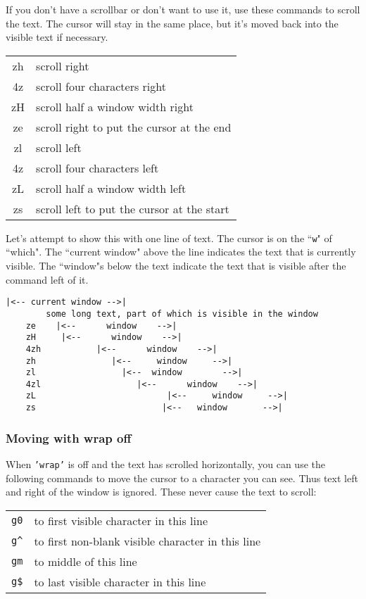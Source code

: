If you don't have a scrollbar or don't want to use it, use these commands to scroll the text.
The cursor will stay in the same place, but it's moved back into the visible text if necessary.

\begin{center} \begin{tabular}{c l}
				zh & scroll right \\
				4z & scroll four characters right \\
				zH & scroll half a window width right \\
				ze & scroll right to put the cursor at the end \\
				zl & scroll left \\
				4z & scroll four characters left \\
				zL & scroll half a window width left \\
				zs & scroll left to put the cursor at the start \\
\end{tabular} \end{center}

Let's attempt to show this with one line of text.
The cursor is on the ``\texttt{w}" of ``which".
The ``current window" above the line indicates the text that is currently visible.
The ``window"s below the text indicate the text that is visible after the command left of it.

\begin{Verbatim}[samepage=true]
                      |<-- current window -->|
        some long text, part of which is visible in the window 
    ze    |<--      window    -->|
    zH     |<--      window    -->|
    4zh           |<--      window    -->|
    zh               |<--     window     -->|
    zl                 |<--  window        -->|
    4zl                   |<--      window    -->|
    zL                          |<--     window     -->|
    zs                         |<--   window       -->|
\end{Verbatim}

\subsubsection{Moving with wrap off}
When \texttt{'wrap'} is off and the text has scrolled horizontally, you can use the following commands to move the cursor to a character you can see.
Thus text left and right of the window is ignored.
These never cause the text to scroll:

\begin{center} \begin{tabular}{c l}
				\texttt{g0} & to first visible character in this line \\
				\texttt{g\^{}} & to first non-blank visible character in this line \\
				\texttt{gm} & to middle of this line \\
				\texttt{g\$} & to last visible character in this line \\
\end{tabular} \end{center}

